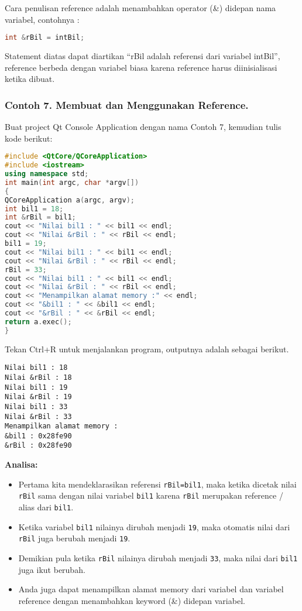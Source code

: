 Cara penulisan reference adalah menambahkan operator (\&) didepan nama
variabel, contohnya :

\begin{lstlisting}[language=c++]
int &rBil = intBil;
\end{lstlisting}

Statement diatas dapat diartikan ``rBil adalah referensi dari variabel
intBil'', reference berbeda dengan variabel biasa karena reference harus
diinisialisasi ketika dibuat.

\subsubsection*{Contoh 7. Membuat dan Menggunakan Reference.}

Buat project Qt Console Application dengan nama Contoh 7, kemudian tulis
kode berikut:

\begin{lstlisting}[language=c++]
#include <QtCore/QCoreApplication>
#include <iostream>
using namespace std;
int main(int argc, char *argv[])
{
QCoreApplication a(argc, argv);
int bil1 = 18;
int &rBil = bil1;
cout << "Nilai bil1 : " << bil1 << endl;
cout << "Nilai &rBil : " << rBil << endl;
bil1 = 19;
cout << "Nilai bil1 : " << bil1 << endl;
cout << "Nilai &rBil : " << rBil << endl;
rBil = 33;
cout << "Nilai bil1 : " << bil1 << endl;
cout << "Nilai &rBil : " << rBil << endl;
cout << "Menampilkan alamat memory :" << endl;
cout << "&bil1 : " << &bil1 << endl;
cout << "&rBil : " << &rBil << endl;
return a.exec();
}
\end{lstlisting}

Tekan Ctrl+R untuk menjalankan program, outputnya adalah sebagai
berikut.

\begin{verbatim}
Nilai bil1 : 18
Nilai &rBil : 18
Nilai bil1 : 19
Nilai &rBil : 19
Nilai bil1 : 33
Nilai &rBil : 33
Menampilkan alamat memory :
&bil1 : 0x28fe90
&rBil : 0x28fe90
\end{verbatim}

\textbf{Analisa:}

\begin{itemize}
\tightlist
\item
  Pertama kita mendeklarasikan referensi \texttt{rBil=bil1}, maka ketika
  dicetak nilai \texttt{rBil} sama dengan nilai variabel \texttt{bil1}
  karena \texttt{rBil} merupakan reference / alias dari \texttt{bil1}.
\item
  Ketika variabel \texttt{bil1} nilainya dirubah menjadi \texttt{19},
  maka otomatis nilai dari \texttt{rBil} juga berubah menjadi
  \texttt{19}.
\item
  Demikian pula ketika \texttt{rBil} nilainya dirubah menjadi
  \texttt{33}, maka nilai dari \texttt{bil1} juga ikut berubah.
\item
  Anda juga dapat menampilkan alamat memory dari variabel dan variabel
  reference dengan menambahkan keyword (\&) didepan variabel.
\end{itemize}

